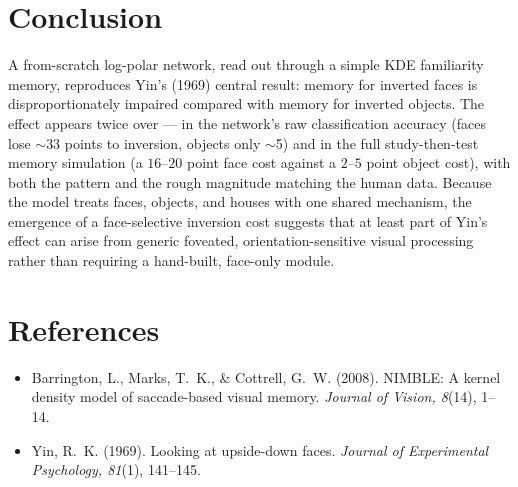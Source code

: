\documentclass[11pt]{article}
\begin{document}
\section{Conclusion}

A from-scratch log-polar network, read out through a simple KDE familiarity memory, reproduces
Yin's (1969) central result: memory for inverted faces is disproportionately impaired compared
with memory for inverted objects. The effect appears twice over --- in the network's raw
classification accuracy (faces lose $\sim$33 points to inversion, objects only $\sim$5) and in
the full study-then-test memory simulation (a $16$--$20$ point face cost against a $2$--$5$
point object cost), with both the pattern and the rough magnitude matching the human data.
Because the model treats faces, objects, and houses with one shared mechanism, the emergence
of a face-selective inversion cost suggests that at least part of Yin's effect can arise from
generic foveated, orientation-sensitive visual processing rather than requiring a hand-built,
face-only module.

\section*{References}

\begin{itemize}
\item Barrington, L., Marks, T.~K., \& Cottrell, G.~W. (2008). NIMBLE: A kernel density model
of saccade-based visual memory. \emph{Journal of Vision, 8}(14), 1--14.
\item Yin, R.~K. (1969). Looking at upside-down faces. \emph{Journal of Experimental
Psychology, 81}(1), 141--145.
\end{itemize}
\end{document}
